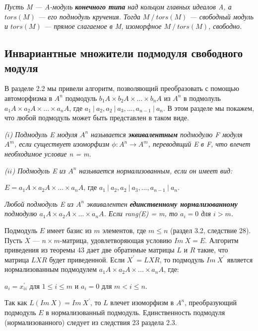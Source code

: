 \begin{predl}
\hspace*{0.5cm}

\textit{
Пусть M — A-модуль \textbf{конечного типа} над кольцом главных идеалов A, а $tors(M)$ — его подмодуль кручения. Тогда $M~/~tors(M)$ — свободный модуль и $tors(M)$ — прямое слагаемое в M, изоморфное $M~/~tors(M)$, свободно. }
\end{predl}
\subsection{Инвариантные множители подмодуля свободного модуля}
\noindent В разделе 2.2 мы привели алгоритм, позволяющий преобразовать с помощью автоморфизма в $A^n$ подмодуль $b_1A \times b_2A \times ... \times b_nA$ из $A^n$ в подмолуль $a_1A \times a_2A \times ... \times a_nA$, где $a_1~|~a_2, a_2~|~a_3, ..., a_{n-1}~|~ a_n$. В этом разделе мы покажем, что любой подмодуль может быть представлен в таком виде.
\begin{determ}
\hspace*{0.5cm}

\textit{($i$) Подмодуль E модуля $A^n$ называется \textbf{эквивалентным} подмодулю F модуля $A^m$, если существует изоморфизм $\phi : A^{n} \rightarrow A^{m}$, переводящий E в F, что влечет необходимое условие n = m.}

\textit{($ii$) Подмодуль E из $A^{n}$ называется нормализованным, если он имеет вид:}
\begin{center}
 $E = a_1A \times a_2A \times ... \times a_nA$, где  $a_1~|~a_2, a_2~|~a_3, ..., a_{n-1}~|~ a_n$.
\end{center}
\end{determ}
\begin{thm}
\hspace*{0.5cm}
\textit{Любой подмодуль E из $A^n$ эквивалентен \textbf{единственному нормализованному} подмодулю $a_1A \times a_2A \times ... \times a_nA$. Если rang(E) = m, то $a_i = 0$ для $i > m$. } 
\end{thm}
\begin{myproof}
Подмодуль $E$ имеет базис из $m$ элементов, где $m \leqslant n$ (раздел 3.2, следствие 28). Пусть $X$ — $n \times m$-матрица, удовлетворяющая условию $Im~X = E$. Алгоритм приведения из теоремы 43 дает две обратимые матрицы $L$ и $R$ такие, что матрица $L X R$ будет приведенной. Если $X^{'} = L X R$, то подмодуль $Im~X^{'}$ является нормализованным подмодулем 
$a_1A \times a_2A \times ... \times a_nA$, где:
\begin{center}
 $a_i = x^{'}_{ii}$ для $1 \leqslant i \leqslant m$  и $a_i = 0$ для $ m < i \leqslant n$. 
\end{center}
\noindent Так как $L(Im~X) = Im~X^{'}$, то $L$ влечет изоморфизм в $A^{n}$, преобразующий подмодуль $E$ в нормализованный подмодуль. Единственность подмодуля (нормализованного) следует из следствия 23 раздела 2.3.
\end{myproof}
